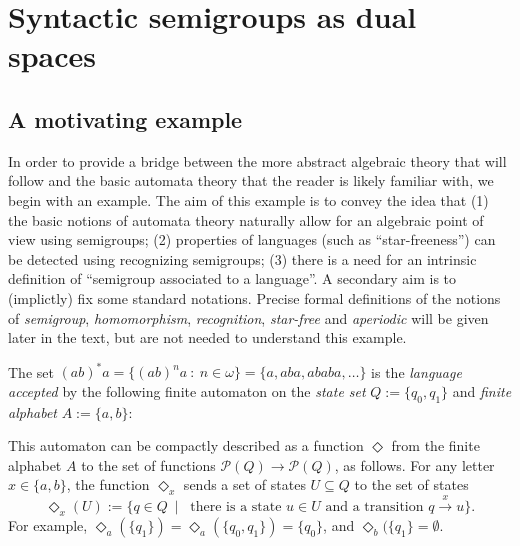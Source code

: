 \chapter{Syntactic semigroups as dual spaces}

\section{A motivating example}\label{sec:example}
In order to provide a bridge between the more abstract algebraic theory that will follow and the basic automata theory that the reader is likely familiar with, we begin with an example. %
% 
The aim of this example is to convey the idea that (1) the basic notions of automata theory naturally allow for an algebraic point of view using semigroups; (2) properties of languages (such as ``star-freeness'') can be detected using recognizing semigroups; (3) there is a need for an intrinsic definition of ``semigroup associated to a language''. A secondary aim is to (implictly) fix some standard notations. Precise formal definitions of the notions of {\it semigroup}, {\it homomorphism}, {\it recognition}, {\it star-free} and {\it aperiodic} will be given later in the text, but are not needed to understand this example.

The set $(ab)^*a = \{ (ab)^na \ : \ n \in \omega \} = \{a, aba, ababa, \dots\}$ is the \emph{language accepted} by the following finite automaton on the \emph{state set} $Q := \{q_0, q_1\}$ and \emph{finite alphabet} $A := \{a,b\}$:

\begin{center}
\end{center}

This automaton can be compactly described as a function $\Diamond$ from the finite alphabet $A$ to the set of functions $\mathcal{P}(Q) \to \mathcal{P}(Q)$, as follows. For any letter $x \in \{a,b\}$, the function $\Diamond_x$ sends a set of states $U \subseteq Q$ to the set of states
\[ \Diamond_x(U) := \{ q \in Q \ \mid \ \text{ there is a state } u \in U \text{ and a transition } q \stackrel{x}{\to} u \}.\]
For example, $\Diamond_a(\{q_1\}) = \Diamond_a(\{q_0,q_1\}) = \{q_0\}$, and $\Diamond_b(\{q_1\} = \emptyset$.

